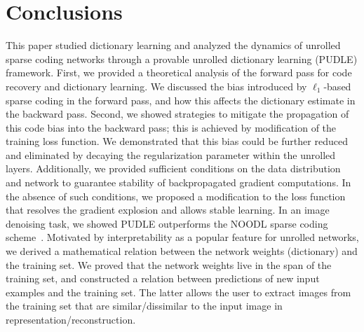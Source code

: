 \documentclass[10pt]{article} %
\begin{document}
\section{Conclusions}
%
This paper studied dictionary learning and analyzed the dynamics of unrolled sparse coding networks through a provable unrolled dictionary learning (PUDLE) framework. First, we provided a theoretical analysis of the forward pass for code recovery and dictionary learning. We discussed the bias introduced by $\ell_1$-based sparse coding in the forward pass, and how this affects the dictionary estimate in the backward pass. Second, we showed strategies to mitigate the propagation of this code bias into the backward pass; this is achieved by modification of the training loss function. We demonstrated that this bias could be further reduced and eliminated by decaying the regularization parameter within the unrolled layers. Additionally, we provided sufficient conditions on the data distribution and network to guarantee stability of backpropagated gradient computations. In the absence of such conditions, we proposed a modification to the loss function that resolves the gradient explosion and allows stable learning. In an image denoising task, we showed PUDLE outperforms the NOODL sparse coding scheme~\citep{rambhatla2018noodl}. Motivated by interpretability as a popular feature for unrolled networks, we derived a mathematical relation between the network weights (dictionary) and the training set. We proved that the network weights live in the span of the training set, and constructed a relation between predictions of new input examples and the training set. The latter allows the user to extract images from the training set that are similar/dissimilar to the input image in representation/reconstruction.


%
\end{document}
